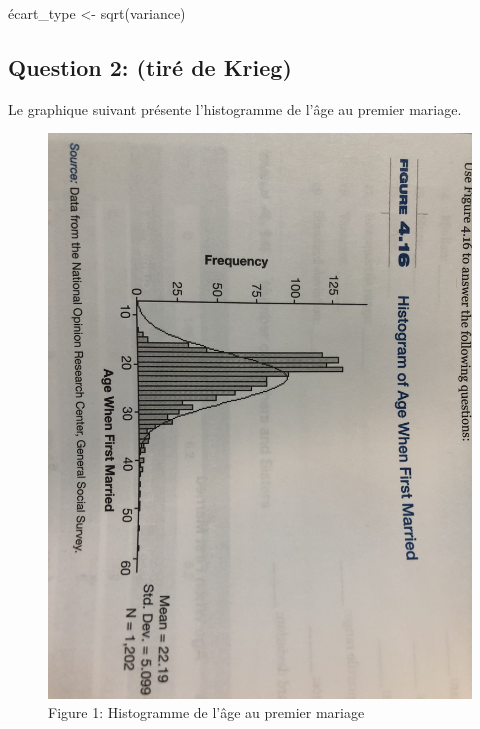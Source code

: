 \documentclass[
]{article}
\newenvironment{Shaded}{\begin{snugshade}}{\end{snugshade}}
\newcommand{\FunctionTok}[1]{\textcolor[rgb]{0.00,0.00,0.00}{#1}}
\newcommand{\NormalTok}[1]{#1}
\newcommand{\OtherTok}[1]{\textcolor[rgb]{0.56,0.35,0.01}{#1}}
\begin{document}
\begin{Shaded}
\begin{Highlighting}[]
\NormalTok{ écart\_type }\OtherTok{\textless{}{-}} \FunctionTok{sqrt}\NormalTok{(variance)}
\end{Highlighting}
\end{Shaded}

\hypertarget{question-2-tiruxe9-de-krieg}{%
\subsection{Question 2: (tiré de
Krieg)}\label{question-2-tiruxe9-de-krieg}}

Le graphique suivant présente l'histogramme de l'âge au premier mariage.

\begin{figure}
\centering
\includegraphics{Histogramme_age_mariage.jpg}
\caption{Figure 1: Histogramme de l'âge au premier mariage}
\end{figure}
\end{document}
